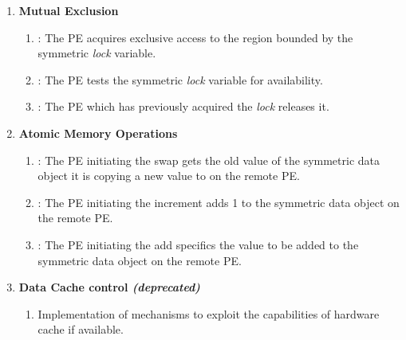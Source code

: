 \begin{enumerate}
\item \textbf{Mutual Exclusion}
\begin{enumerate}
\item {}: The \ac{PE} acquires exclusive access to the region bounded by the symmetric \textit{lock} variable.
\item {}: The \ac{PE} tests the symmetric \textit{lock} variable for availability.
\item {}: The \ac{PE} which has previously acquired the \textit{lock} releases it.
\end{enumerate}

\item \textbf{Atomic Memory Operations}
\begin{enumerate}
\item {}: The \ac{PE} initiating the swap gets the old value of the symmetric data object it is copying a new value to on the remote \ac{PE}.
\item {}: The \ac{PE} initiating the increment adds 1 to the symmetric data object on the remote \ac{PE}.
\item {}: The \ac{PE} initiating the add specifics the value to be added to the symmetric data object on the remote \ac{PE}.
\end{enumerate}

\item \textbf{Data Cache control \textit{(deprecated)}}
\begin{enumerate}
\item Implementation of mechanisms to exploit the capabilities of hardware
cache if available.
\end{enumerate}
\end{enumerate}

